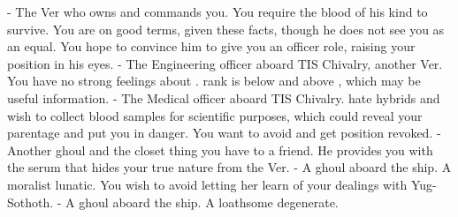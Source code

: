 \documentclass[char]{guildcamp4}
\begin{document}
\begin{contacts}
	\contact{\cVone{}} - The Ver who owns and commands you. You require the blood of his kind to survive. You are on good terms, given these facts, though he does not see you as an equal. You hope to convince him to give you an officer role, raising your position in his eyes.
	\contact{\cVtwo{}} - The Engineering officer aboard TIS Chivalry, another Ver. You have no strong feelings about \cVtwo{\them}. \cVtwo{\their} rank is below \cVone{} and above \cVthree{}, which may be useful information.
	\contact{\cVthree{}} - The Medical officer aboard TIS Chivalry. \cVthree{\They} hate hybrids and wish to collect blood samples for scientific purposes, which could reveal your parentage and put you in danger. You want to avoid \cVthree{\them} and get \cVthree{\their} position revoked.
	\contact{\cJames{}} - Another ghoul and the closet thing you have to a friend. He provides you with the serum that hides your true nature from the Ver. 
	\contact{\cJoan{}} - A ghoul aboard the ship. A moralist lunatic. You wish to avoid letting her learn of your dealings with Yug-Sothoth.  
	\contact{\cJulie{}} - A ghoul aboard the ship. A loathsome degenerate. 
\end{contacts}

\end{document}
